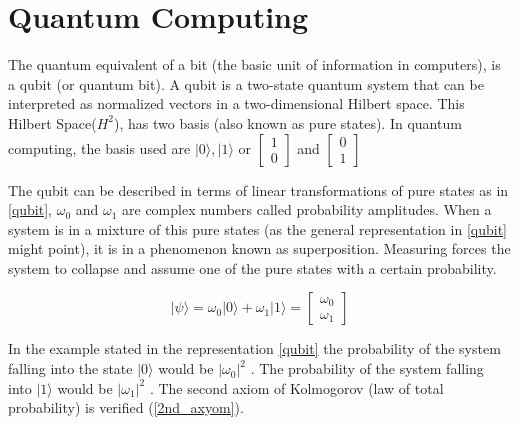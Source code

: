 


\section{Quantum Computing}
\label{sec:int_quantum_computing}





The quantum equivalent of a bit (the basic unit of information in computers), is a qubit (or quantum bit). A qubit is a two-state quantum system that can be interpreted as normalized vectors in a two-dimensional Hilbert space. This Hilbert Space($H^2$), has two basis (also known as pure states). In quantum computing, the basis used are ${ \vert 0 \rangle , \vert 1 \rangle }$ or $\left[\begin{array}{c}
1\\
0
\end{array}\right]$
 and 
$\left[\begin{array}{c}
0\\
1
\end{array}\right]$ 

The qubit can be described in terms of linear transformations of pure states as in \ref{qubit}, $\omega_{0}$ and $\omega_{1}$ are complex numbers called probability amplitudes. When a system is in a mixture of this pure states (as the general representation in \ref{qubit} might point), it is in a phenomenon known as superposition. Measuring forces the system to collapse and assume one of the pure states with a certain probability. 

\begin{equation}
\label{qubit}
\vert \psi \rangle = \omega_{0}\vert0\rangle+\omega_{1}\vert1\rangle = \left[\begin{array}{c}
\omega_{0}\\
\omega_{1}
\end{array}\right]
\end{equation}

In the example stated in the representation \ref{qubit} the probability of the system falling into the state $\vert 0 \rangle $ would be $\vert\omega_{0}\vert^{2}$ . The probability of the system falling into $\vert 1 \rangle $ would be $\vert\omega_{1}\vert^{2}$ . The second axiom of Kolmogorov (law of total probability) is verified (\ref{2nd_axyom}).

